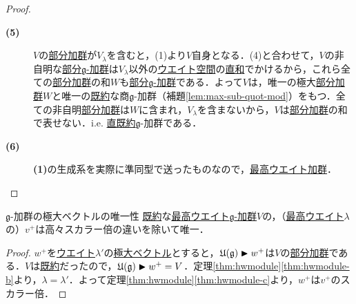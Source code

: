 \documentclass[rep_main]{subfiles}
\begin{document}
\begin{proof}
\begin{description}
		\item[\textbf{(5)}] $V$の\hyperref[def:sub-g-module]{部分加群}が$V_\lambda$を含むと，(1)より$V$自身となる．(4)と合わせて，$V$の非自明な\hyperref[def:sub-g-module]{部分$\mathfrak{g}$-加群}は$V_\lambda$以外の\hyperref[def:weight-rep]{ウエイト空間}の\hyperref[def:univ-vec-sum]{直和}でかけるから，これら全ての\hyperref[def:sub-g-module]{部分加群}の和$W$も\hyperref[def:sub-g-module]{部分$\mathfrak{g}$-加群}である．よって$V$は，唯一の極大\hyperref[def:sub-g-module]{部分加群}$W$と唯一の\hyperref[def:irr]{既約}な商$\mathfrak{g}$-加群（補題\ref{lem:max-sub-quot-mod}）をもつ．全ての非自明\hyperref[def:sub-g-module]{部分加群}は$W$に含まれ，$V_\lambda$を含まないから，$V$は\hyperref[def:sub-g-module]{部分加群}の和で表せない．i.e. \hyperref[def:irr]{直既約}$\mathfrak{g}$-加群である．\\
		\item[\textbf{(6)}] \textbf{(1)}の生成系を実際に準同型で送ったものなので，\hyperref[def:highest-weight-module]{最高ウエイト加群}．
	\end{description}
\end{proof}

\begin{mycol}[label=col:highest-weight-uni]{$\mathfrak{g}$-加群の極大ベクトルの唯一性}
	\hyperref[def:irr]{既約}な\hyperref[def:highest-weight-module]{最高ウエイト$\mathfrak{g}$-加群}$V$の，（\hyperref[def:highest-weight-module]{最高ウエイト}$\lambda$の）$v^+$は高々スカラー倍の違いを除いて唯一．
\end{mycol}
\begin{proof}
	$w^+$を\hyperref[def:weight-rep]{ウエイト}$\lambda'$の\hyperref[def:maximal-vector-rep]{極大ベクトル}とすると，$\mathfrak{U}(\mathfrak{g}) \blacktriangleright w^+$は$V$の\hyperref[def:sub-g-module]{部分加群}である．$V$は\hyperref[def:irr]{既約}だったので，$\mathfrak{U}(\mathfrak{g}) \blacktriangleright w^+ = V$．定理\ref{thm:hwmodule}\ref{thm:hwmodule-b}より，$\lambda = \lambda'$．よって定理\ref{thm:hwmodule}\ref{thm:hwmodule-c}より，$w^+$は$v^+$のスカラー倍．
\end{proof}
\end{document}

